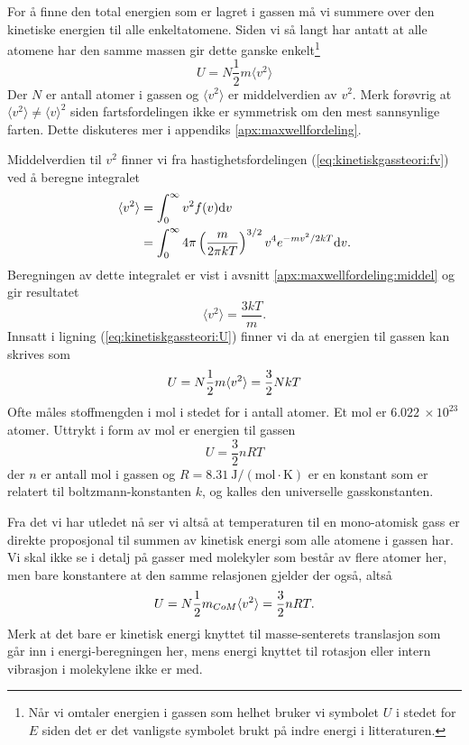 For å finne den total energien som er lagret i gassen må vi summere over den kinetiske energien til alle enkeltatomene. Siden vi så langt har antatt at alle atomene har den samme massen gir dette ganske enkelt\footnote{Når vi omtaler energien i gassen som helhet bruker vi symbolet $U$ i stedet for $E$ siden det er det vanligste symbolet brukt på indre energi i litteraturen.}
\begin{equation}
\label{eq:kinetiskgassteori:U}
	U = N\frac{1}{2}m\langle v^2 \rangle
\end{equation}
Der $N$ er antall atomer i gassen og $\langle v^2 \rangle$ er middelverdien av $v^2$. Merk forøvrig at $\langle v^2 \rangle \neq \langle v \rangle^2$ siden fartsfordelingen ikke er symmetrisk om den mest sannsynlige farten. Dette diskuteres mer i appendiks \ref{apx:maxwellfordeling}.

Middelverdien til $v^2$ finner vi fra hastighetsfordelingen (\ref{eq:kinetiskgassteori:fv}) ved å beregne integralet
\begin{displaymath}
\begin{aligned}
	\langle v^2 \rangle &= \int_0^\infty v^2 f(v) \text{d} v \\
	&= \int_0^\infty 4\pi\left(\frac{m}{2\pi kT}\right)^{3/2} v^4 e^{-mv^2/2kT}\text{d} v.
\end{aligned}
\end{displaymath}
Beregningen av dette integralet er vist i avsnitt \ref{apx:maxwellfordeling:middel} og gir resultatet
\begin{displaymath}
	\langle v^2 \rangle = \frac{3kT}{m}.
\end{displaymath}
Innsatt i ligning (\ref{eq:kinetiskgassteori:U}) finner vi da at energien til gassen kan skrives som
\begin{equation}
\label{eq:kinetiskgassteori:Eideellgass}
	U = N\frac{1}{2} m\langle v^2 \rangle = \frac{3}{2}NkT
\end{equation}
Ofte måles stoffmengden i mol i stedet for i antall atomer. Et mol er $6.022~\times10^{23}$ atomer. Uttrykt i form av mol er energien til gassen 
\begin{equation}
\label{eq:kinetiskgassteori:EideellgassMol}
	U = \frac{3}{2}nRT
\end{equation}
der $n$ er antall mol i gassen og $R = 8.31~\mathrm{J/(mol\cdot K)}$ er en konstant som er relatert til boltzmann-konstanten $k$, og kalles den universelle gasskonstanten.	

Fra det vi har utledet nå ser vi altså at temperaturen til en mono-atomisk gass er direkte proposjonal til summen av kinetisk energi som alle atomene i gassen har. Vi skal ikke se i detalj på gasser med molekyler som består av flere atomer her, men bare konstantere at den samme relasjonen gjelder der også, altså
\begin{displaymath}
	U = N\frac{1}{2} m_{CoM}\langle v^2\rangle = \frac{3}{2}nRT.
\end{displaymath}
Merk at det bare er kinetisk energi knyttet til masse-senterets translasjon som går inn i energi-beregningen her, mens energi knyttet til rotasjon eller intern vibrasjon i molekylene ikke er med.


